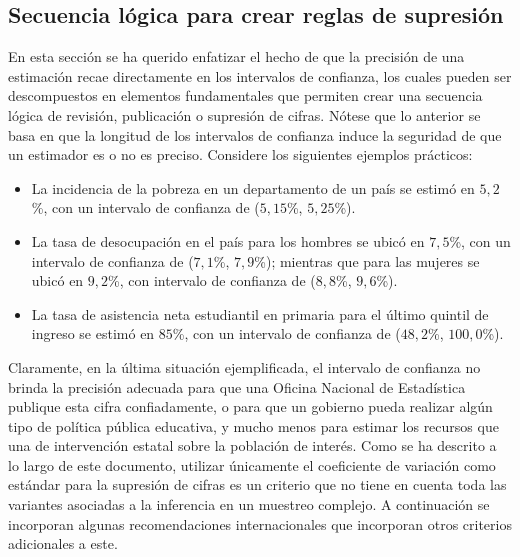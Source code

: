 \documentclass[
  12pt,
  spanish,
]{book}
\providecommand{\tightlist}{%
  \setlength{\itemsep}{0pt}\setlength{\parskip}{0pt}}
\begin{document}
\hypertarget{secuencia-luxf3gica-para-crear-reglas-de-supresiuxf3n}{%
\subsection{Secuencia lógica para crear reglas de supresión}\label{secuencia-luxf3gica-para-crear-reglas-de-supresiuxf3n}}

En esta sección se ha querido enfatizar el hecho de que la precisión de una estimación recae directamente en los intervalos de confianza, los cuales pueden ser descompuestos en elementos fundamentales que permiten crear una secuencia lógica de revisión, publicación o supresión de cifras. Nótese que lo anterior se basa en que la longitud de los intervalos de confianza induce la seguridad de que un estimador es o no es preciso. Considere los siguientes ejemplos prácticos:

\begin{itemize}
\tightlist
\item
  La incidencia de la pobreza en un departamento de un país se estimó en \(5,2\)\%, con un intervalo de confianza de (\(5,15\)\%, \(5,25\)\%).
\item
  La tasa de desocupación en el país para los hombres se ubicó en \(7,5\)\%, con un intervalo de confianza de (\(7,1\)\%, \(7,9\)\%); mientras que para las mujeres se ubicó en \(9,2\)\%, con intervalo de confianza de (\(8,8\)\%, \(9,6\)\%).
\item
  La tasa de asistencia neta estudiantil en primaria para el último quintil de ingreso se estimó en \(85\)\%, con un intervalo de confianza de (\(48,2\)\%, \(100,0\)\%).
\end{itemize}

Claramente, en la última situación ejemplificada, el intervalo de confianza no brinda la precisión adecuada para que una Oficina Nacional de Estadística publique esta cifra confiadamente, o para que un gobierno pueda realizar algún tipo de política pública educativa, y mucho menos para estimar los recursos que una de intervención estatal sobre la población de interés. Como se ha descrito a lo largo de este documento, utilizar únicamente el coeficiente de variación como estándar para la supresión de cifras es un criterio que no tiene en cuenta toda las variantes asociadas a la inferencia en un muestreo complejo. A continuación se incorporan algunas recomendaciones internacionales que incorporan otros criterios adicionales a este.
\end{document}
